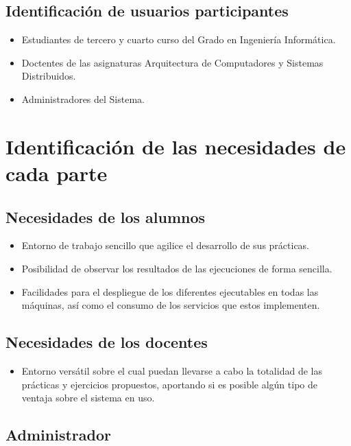 \subsection{Identificación de usuarios participantes}

\begin{itemize}

  \item Estudiantes de tercero y cuarto curso del Grado en Ingeniería Informática.
  \item Doctentes de las asignaturas Arquitectura de Computadores y Sistemas Distribuidos.
  \item Administradores del Sistema.
\end{itemize}

\section{Identificación de las necesidades de cada parte}
\subsection{Necesidades de los alumnos}

\begin{itemize}
  \item Entorno de trabajo sencillo que agilice el desarrollo de sus prácticas.
  \item Posibilidad de observar los resultados de las ejecuciones de forma sencilla.
  \item Facilidades para el despliegue de los diferentes ejecutables en todas las máquinas, así como el consumo de los servicios que estos implementen.
\end{itemize}

\subsection{Necesidades de los docentes}

\begin{itemize}
  \item Entorno versátil sobre el cual puedan llevarse a cabo la totalidad de las prácticas y ejercicios propuestos, aportando si es posible algún tipo de ventaja sobre el sistema en uso.
\end{itemize}

\subsection{Administrador}

